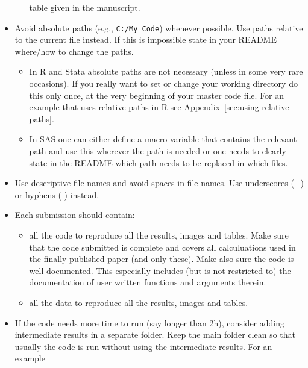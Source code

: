\documentclass[12pt,a4paper]{article}
\begin{document}
\begin{itemize}
\begin{itemize}
    table given in the manuscript.
  \end{itemize}
\item Avoid absolute paths (e.g., \verb+C:/My Code+) whenever possible. Use
  paths relative to the current file instead. If this is impossible state in
  your README where/how to change the paths.
  \begin{itemize}
  \item In \textsf{R} and \textsf{Stata} absolute paths are not necessary
    (unless in some very rare occasions). If you really want to set or change
    your working directory do this only once, at the very beginning of your
    master code file. For an example that uses relative paths in \textsf{R} see
    Appendix~\ref{sec:using-relative-paths}.
  \item In \textsf{SAS} one can either define a macro variable that contains the
    relevant path and use this wherever the path is needed or one needs to
    clearly state in the README which path needs to be replaced in which files.
  \end{itemize}
\item Use descriptive file names and avoid spaces in file names. Use underscores
  (\_) or hyphens (-) instead.
\item Each submission {should} contain:
\begin{itemize}
\item all the code to reproduce all the results, images and tables. Make sure
  that the code submitted is complete and covers all calculuations used in the
  finally published paper (and only these). Make also sure the code is well
  documented. This especially includes (but is not restricted to) the
  documentation of user written functions and arguments therein.
\item all the data to reproduce all the results, images and tables. %
\end{itemize}
\item If the code needs more time to run (say longer than 2h), consider adding
  intermediate results in a separate folder. Keep the main folder clean so that
  usually the code is run without using the intermediate results. For an example

\end{itemize}
\end{document}

